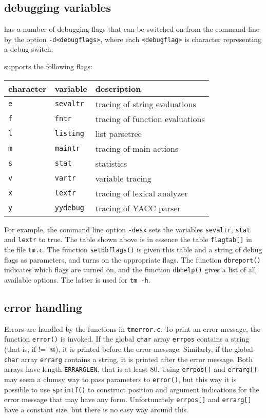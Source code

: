\subsection{debugging variables}
{\Tm} has a number of debugging flags
that can be switched on from the command line by the
option \verb!-d<debugflags>!,
where each \verb!<debugflag>! is character representing a debug switch.
\par
{\Tm} supports the following flags:
\par
\begin{tabular}{lll}
character & variable & description \\
\hline
\texttt{e} & \texttt{sevaltr} & tracing of string evaluations \\
\texttt{f} & \texttt{fntr} & tracing of function evaluations \\
\texttt{l} & \texttt{listing} & list parsetree \\
\texttt{m} & \texttt{maintr} & tracing of main actions \\
\texttt{s} & \texttt{stat} & statistics \\
\texttt{v} & \texttt{vartr} & variable tracing \\
\texttt{x} & \texttt{lextr} & tracing of lexical analyzer \\
\texttt{y} & \texttt{yydebug} & tracing of YACC parser \\
\end{tabular}
\par
For example, the command line option \verb!-desx! sets the variables
\texttt{sevaltr}, \texttt{stat} and \texttt{lextr} to true.
The table shown above is in essence the table \texttt{flagtab[]}
in the file \texttt{tm.c}.
The function \texttt{setdbflags()} is given this table and a string of debug
flags as parameters, and turns on the appropriate flags.
The function \texttt{dbreport()} indicates which flags are turned on,
and the function \texttt{dbhelp()} gives a list of all available options.
The latter is used for \verb!tm -h!.
\subsection{error handling}
Errors are handled by the functions in \texttt{tmerror.c}.
To print an error message, the function \texttt{error()} is invoked.
If the global \texttt{char} array \texttt{errpos} contains a string (that
is, if \verb@errpos[0]!='\0'@),
it is printed before the error message. 
Similarly, if the global \texttt{char} array \texttt{errarg} contains a string,
it is printed after the error message.
Both arrays have length \texttt{ERRARGLEN}, that is at least 80.
Using \texttt{errpos[]} and \texttt{errarg[]} may seem a clumsy way to pass
parameters to \texttt{error()},
but this way it is possible to use \texttt{sprintf()} to construct position
and argument indications for the error message that may have any form.
Unfortunately \texttt{errpos[]} and \texttt{errarg[]} have a constant size,
but there is no easy way around this.
